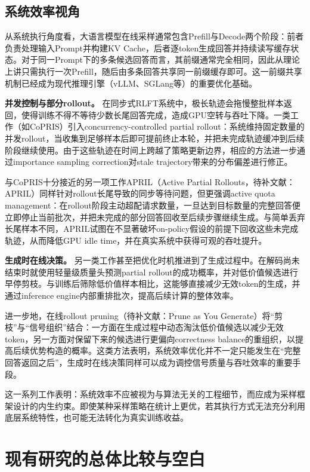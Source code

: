 \subsection{系统效率视角}
\label{subsec:system_efficiency}

从系统执行角度看，大语言模型在线采样通常包含Prefill与Decode两个阶段：前者负责处理输入Prompt并构建KV Cache，后者逐token生成回答并持续读写缓存状态。对于同一Prompt下的多条候选回答而言，其前缀通常完全相同，因此从理论上讲只需执行一次Prefill，随后由多条回答共享同一前缀缓存即可。这一前缀共享机制已经成为现代推理引擎（vLLM、SGLang等）的重要优化基础。

\textbf{并发控制与部分rollout。} 在同步式RLFT系统中，极长轨迹会拖慢整批样本返回，使得训练不得不等待少数长尾回答完成，造成GPU空转与吞吐下降。一类工作（如CoPRIS）引入concurrency-controlled partial rollout：系统维持固定数量的并发rollout，当收集到足够样本后即可提前终止本轮，并把未完成轨迹缓冲到后续阶段继续使用。由于这些轨迹在时间上跨越了策略更新边界，相应的方法进一步通过importance sampling correction对stale trajectory带来的分布偏差进行修正。

与CoPRIS十分接近的另一项工作APRIL（Active Partial Rollouts，待补文献：APRIL）同样针对rollout长尾导致的同步等待问题，但更强调active quota management：在rollout阶段主动超配请求数量，一旦达到目标数量的完整回答便立即停止当前批次，并把未完成的部分回答回收至后续步骤继续生成。与简单丢弃长尾样本不同，APRIL试图在不显著破坏on-policy假设的前提下回收这些未完成轨迹，从而降低GPU idle time，并在真实系统中获得可观的吞吐提升。

\textbf{生成时在线决策。} 另一类工作甚至把优化时机推进到了生成过程中。在解码尚未结束时就使用轻量级质量头预测partial rollout的成功概率，并对低价值候选进行早停剪枝。与训练后筛除低价值样本相比，这能够直接减少无效token的生成，并通过inference engine内部重排批次，提高后续计算的整体效率。

进一步地，在线rollout pruning（待补文献：Prune as You Generate）将“剪枝”与“信号组织”结合：一方面在生成过程中动态淘汰低价值候选以减少无效token，另一方面对保留下来的候选进行更偏向correctness balance的重组织，以提高后续优势构造的概率。这类方法表明，系统效率优化并不一定只能发生在“完整回答返回之后”，生成时在线决策同样可以成为调控信号质量与吞吐效率的重要手段。

这一系列工作表明：系统效率不应被视为与算法无关的工程细节，而应成为采样框架设计的内生约束。即使某种采样策略在统计上更优，若其执行方式无法充分利用底层系统特性，也可能无法转化为真实训练收益。

\section{现有研究的总体比较与空白}
\label{sec:research_gaps}

